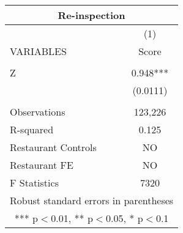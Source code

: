 \begin{tabular}{lc}
\multicolumn{2}{c}{Re-inspection} \\ \hline
 & (1) \\
VARIABLES & Score \\ \hline
 &  \\
Z & 0.948*** \\
 & (0.0111) \\
 &  \\
Observations & 123,226 \\
R-squared & 0.125 \\
Restaurant Controls & NO \\
Restaurant FE & NO \\
 F Statistics & 7320 \\ \hline
\multicolumn{2}{c}{ Robust standard errors in parentheses} \\
\multicolumn{2}{c}{ *** p$<$0.01, ** p$<$0.05, * p$<$0.1} \\
\end{tabular}
